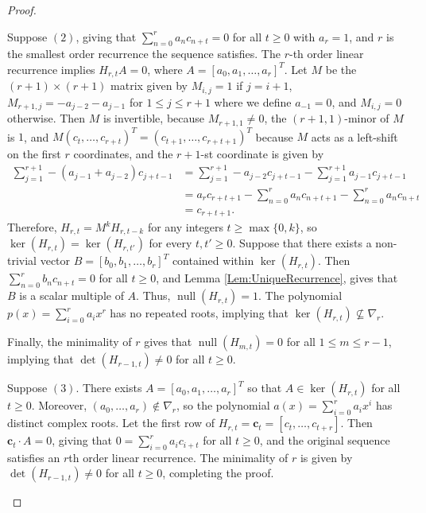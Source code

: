 \documentclass[12pt,reqno]{article}
\DeclareMathOperator{\nul}{null}
\begin{document}
\begin{proof}
\begin{description}
\item[$3 \Leftrightarrow 2$:] Suppose $(2)$, giving that 
$\sum_{n=0}^r a_n c_{n+t} = 0$ for all $t\geq0$ with $a_r = 1$, and $r$ is the smallest order recurrence the sequence satisfies. The $r$-th order linear recurrence implies $H_{r,t}A = 0$, where $A = [a_0,a_1,\dotsc,a_r]^T$. Let $M$ be the $(r+1) \times (r+1)$ matrix given by $M_{i,j} = 1$ if $j = i+1$, $M_{r+1,j} = -a_{j-2}-a_{j-1}$ for $1 \leq j \leq r+1$ where we define $a_{-1} = 0$, and $M_{i,j} = 0$ otherwise.  Then $M$ is invertible, because $M_{r+1,1} \neq 0$, the $(r+1,1)$-minor of $M$ is $1$, and $M (c_t,\ldots,c_{r+t})^T = (c_{t+1},\ldots,c_{r+t+1})^T$ because $M$ acts as a left-shift on the first $r$ coordinates, and the $r+1$-st coordinate is given by
\begin{align*}
\sum_{j=1}^{r+1} -(a_{j-1}+a_{j-2}) c_{j+t-1} & = \sum_{j=1}^{r+1} -a_{j-2} c_{j+t-1} - \sum_{j=1}^{r+1} a_{j-1} c_{j+t-1} \\
& = a_{r} c_{r+t+1} - \sum_{n=0}^{r} a_{n} c_{n+t+1} - \sum_{n=0}^{r} a_{n} c_{n+t} \\
& = c_{r+t+1}.
\end{align*}
Therefore, $H_{r,t} = M^k H_{r,t-k}$ for any integers $t \geq \max\{0,k\}$, so $\ker(H_{r,t}) = \ker(H_{r,t'})$ for every $t,t' \geq 0$. Suppose that there exists a non-trivial vector $B = [b_0,b_1,\dotsc,b_r]^T$ contained within $\ker(H_{r,t})$. Then $\sum_{n=0}^r b_n c_{n+t} = 0$ for all $t\geq0$, and Lemma \ref{Lem:UniqueRecurrence}, gives that $B$ is a scalar multiple of $A$. Thus, $\nul(H_{r,t})= 1$.  The polynomial $p(x) = \sum_{i=0}^r a_i x^{r}$ has no repeated roots, implying that $\ker(H_{r,t}) \not\subseteq \nabla_r$.




Finally, the minimality of $r$ gives that $\nul(H_{m,t}) = 0$ for all $1\leq m\leq r-1$, implying that $\det(H_{r-1,t}) \neq 0$ for all $t\geq 0$. 

\item Suppose $(3)$. There exists $A = [a_0,a_1,\dotsc,a_r]^T$ so that $A\in\ker(H_{r,t})$ for all $t\geq0$. Moreover, $(a_0,\dotsc,a_r) \notin \nabla_r$, so the polynomial $a(x) = \sum_{i=0}^r a_i x^i$ has distinct complex roots. Let the first row of $H_{r,t} = \textbf{c}_t = [c_{t},\dotsc,c_{t+r}]$. Then $\textbf{c}_t \cdot A = 0$, giving that $0 = \sum_{i=0}^r a_i c_{i+t}$ for all $t\geq 0$, and the original sequence satisfies an $r$th order linear recurrence. The minimality of $r$ is given by $\det(H_{r-1,t})\neq 0$ for all $t\geq 0$, completing the proof. 


\end{description}
\end{proof}
\end{document}
